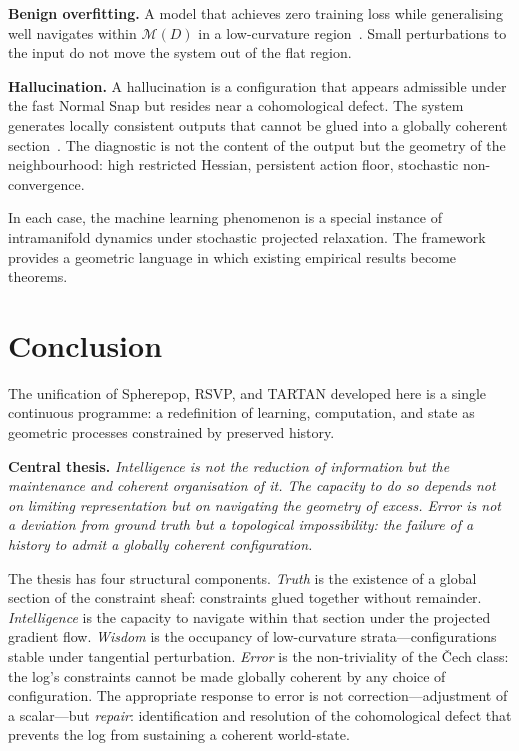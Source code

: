 \documentclass[12pt,oneside]{article}
\theoremstyle{plain}
\theoremstyle{definition}
\theoremstyle{remark}
\newcommand{\M}{\mathcal{M}}
\newcommand{\D}{D}
\begin{document}
\medskip\noindent\textbf{Benign overfitting.} A model that achieves zero
training loss while generalising well navigates within $\M(\D)$ in a
low-curvature region~\cite{DubovaSloman2026}. Small perturbations to the input
do not move the system out of the flat region.

\medskip\noindent\textbf{Hallucination.} A hallucination is a configuration that
appears admissible under the fast Normal Snap but resides near a cohomological
defect. The system generates locally consistent outputs that cannot be glued into
a globally coherent section~\cite{AbramskyBrandenburger2011}. The diagnostic is
not the content of the output but the geometry of the neighbourhood: high
restricted Hessian, persistent action floor, stochastic non-convergence.

In each case, the machine learning phenomenon is a special instance of
intramanifold dynamics under stochastic projected relaxation. The framework
provides a geometric language in which existing empirical results become theorems.

\section{Conclusion}
\label{sec:conclusion}

The unification of Spherepop, RSVP,
and TARTAN developed here is a single continuous programme:
a redefinition of learning, computation, and state as geometric processes
constrained by preserved history.

\medskip\noindent\textbf{Central thesis.} \emph{Intelligence is not the
reduction of information but the maintenance and coherent organisation of it.
The capacity to do so depends not on limiting representation but on navigating
the geometry of excess. Error is not a deviation from ground truth but a
topological impossibility: the failure of a history to admit a globally coherent
configuration.}

\medskip
The thesis has four structural components. \emph{Truth} is the existence of a
global section of the constraint sheaf: constraints glued together without
remainder. \emph{Intelligence} is the capacity to navigate within that section
under the projected gradient flow. \emph{Wisdom} is the occupancy of
low-curvature strata---configurations stable under tangential perturbation.
\emph{Error} is the non-triviality of the \v{C}ech class: the log's constraints
cannot be made globally coherent by any choice of configuration. The appropriate
response to error is not correction---adjustment of a scalar---but
\emph{repair}: identification and resolution of the cohomological defect that
prevents the log from sustaining a coherent world-state.
\end{document}
